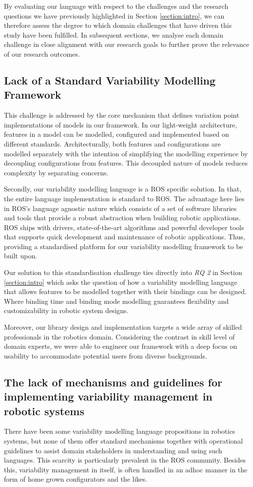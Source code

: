 \documentclass[conference]{IEEEtran}
\begin{document}
By evaluating our language with respect to the challenges and the research questions we have previously highlighted in Section \ref{section:intro}, we can therefore assess the degree to which domain challenges that have driven this study have been fulfilled. In subsequent sections, we analyse each domain challenge in close alignment with our research goals to further prove the relevance of our research outcomes.

\subsection{Lack of a Standard Variability Modelling Framework}
This challenge is addressed by the core mechanism that defines variation point implementations of models in our framework. In our light-weight architecture, features in a model can be modelled, configured and implemented based on different standards. Architecturally, both features and configurations are modelled separately with the intention of simplifying the modelling experience by decoupling configurations from features. This decoupled nature of models reduces complexity by separating concerns.

Secondly, our variability modelling language is a ROS specific solution. In that, the entire language implementation is standard to ROS. The advantage here lies in ROS's language agnostic nature which consists of a set of software libraries and tools that provide a robust abstraction when building robotic applications. ROS ships with drivers, state-of-the-art algorithms and powerful developer tools that supports quick development and maintenance of robotic applications. Thus, providing a standardised platform for our variability modelling framework to be built upon.

Our solution to this standardisation challenge ties directly into \textit{RQ 2} in Section \ref{section:intro} which asks the question of how a variability modelling language that allows features to be modelled together with their bindings can be designed. Where binding time and binding mode modelling guarantees flexibility and customizability in robotic system designs.

Moreover, our library design and implementation targets a wide array of skilled professionals in the robotics domain. Considering the contrast in skill level of domain experts, we were able to engineer our framework with a deep focus on usability to accommodate potential users from diverse backgrounds.

\subsection{The lack of mechanisms and guidelines for implementing variability management in robotic systems}
There have been some variability modelling language propositions in robotics systems, but none of them offer standard mechanisms together with operational guidelines to assist domain stakeholders in understanding and using such languages. This scarcity is particularly prevalent in the ROS community. Besides this, variability management in itself, is often handled in an adhoc manner in the form of home grown configurators and the likes.
\end{document}
